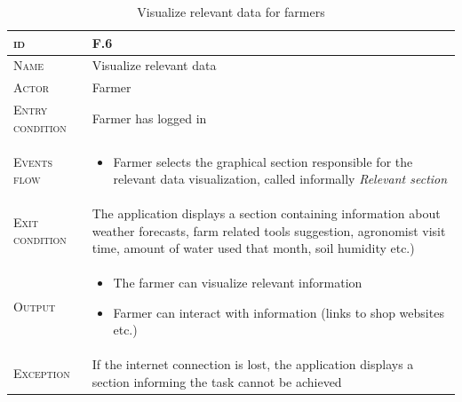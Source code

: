 \begin{table}[H]
    \centering
    \begin{tabular}{|l|m{}|}
        \hline %
    	\textsc{id}                 &   F.6\\
    	\hline %
    	\textsc{Name}               &   Visualize relevant data\\
    	\hline %
    	\textsc{Actor}             &   Farmer\\
    	\hline %
    	\textsc{Entry condition}   &   Farmer has logged in\\
    	\hline %
    	\textsc{Events flow}         &   %
            	                        \begin{itemize}
                                    	    \item Farmer selects the graphical section responsible for the relevant data visualization, called informally \textit{Relevant section}
                                        \end{itemize}\\
        \hline %
        \textsc{Exit condition}    &  The application displays a section containing information about weather forecasts, farm related tools suggestion, agronomist visit time, amount of water used that month, soil humidity etc.)\\
    	\hline %
    	\textsc{Output}             &  \begin{itemize}
    	    \item The farmer can visualize relevant information
    	    \item Farmer can interact with information (links to shop websites etc.)
    	\end{itemize}\\
    	\hline %
    	\textsc{Exception}         &   If the internet connection is lost, the application displays a section informing the task cannot be achieved\\
    	\hline %
        
    \end{tabular}

\caption{\label{tab:visualize_relevant_data}Visualize relevant data for farmers}
\end{table}

